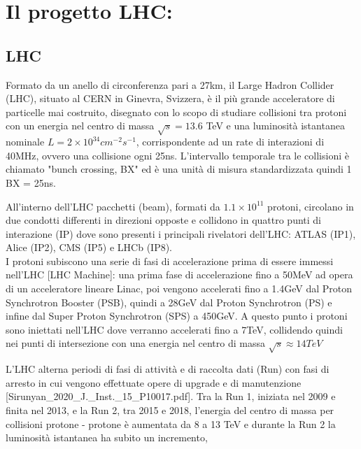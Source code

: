 \chapter{Il progetto LHC:}


\section{LHC}
Formato da un anello di circonferenza pari a 27km, il Large Hadron Collider (LHC), situato al CERN in Ginevra, Svizzera, è il più grande acceleratore di particelle mai costruito, disegnato con lo scopo di studiare collisioni tra protoni con un energia nel centro di massa $\sqrt{s} = 13.6$ TeV e una luminosità istantanea nominale $L = 2 \times 10^{34} cm^{-2} s^{-1}$, corrispondente ad un rate di interazioni di 40MHz, ovvero una collisione ogni 25ns. L'intervallo temporale tra le collisioni è chiamato "bunch crossing, BX" ed è una unità di misura standardizzata quindi 1 BX = 25ns.


All'interno dell'LHC pacchetti (beam), formati da $1.1 \times 10^{11}$ protoni, circolano in due condotti differenti in direzioni opposte e collidono in quattro punti di interazione (IP) dove sono presenti i principali rivelatori dell'LHC: ATLAS (IP1), Alice (IP2), CMS (IP5) e LHCb (IP8). \\

I protoni subiscono una serie di fasi di accelerazione prima di essere immessi nell'LHC [LHC Machine]: una prima fase di accelerazione fino a 50MeV ad opera di un acceleratore lineare Linac, poi vengono accelerati fino a 1.4GeV dal Proton Synchrotron Booster (PSB), quindi a 28GeV dal Proton Synchrotron (PS) e infine dal Super Proton Synchrotron (SPS) a 450GeV. A questo punto i protoni sono iniettati nell'LHC dove verranno accelerati fino a 7TeV, collidendo quindi nei punti di intersezione con una energia nel centro di massa $\sqrt{s} \approx 14TeV$

L'LHC alterna periodi di fasi di attività e di raccolta dati (Run) con fasi di arresto in cui vengono effettuate opere di upgrade e di manutenzione [Sirunyan_2020_J._Inst._15_P10017.pdf]. Tra la Run 1, iniziata nel 2009 e finita nel 2013, e la Run 2, tra 2015 e 2018, l'energia del centro di massa per collisioni protone - protone è aumentata da 8 a 13 TeV e durante la Run 2 la luminosità istantanea ha subito un incremento, 




